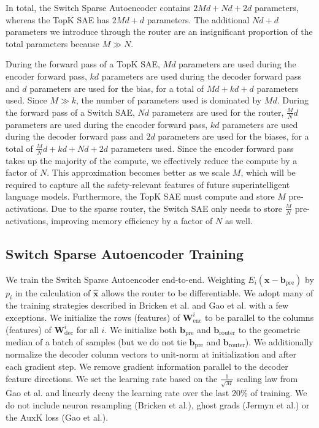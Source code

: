 \documentclass{article} %
\begin{document}
In total, the Switch Sparse Autoencoder contains \( 2Md + Nd + 2d \) parameters, whereas the TopK SAE has \( 2Md + d \) parameters. The additional \( Nd + d \) parameters we introduce through the router are an insignificant proportion of the total parameters because \( M \gg N \).

During the forward pass of a TopK SAE, \( Md \) parameters are used during the encoder forward pass, \( kd \) parameters are used during the decoder forward pass and \( d \) parameters are used for the bias, for a total of \( Md + kd + d \) parameters used. Since \( M \gg k \), the number of parameters used is dominated by \( Md \). During the forward pass of a Switch SAE, \( Nd \) parameters are used for the router, \( \frac{M}{N} d \) parameters are used during the encoder forward pass, \( kd \) parameters are used during the decoder forward pass and \( 2d \) parameters are used for the biases, for a total of \( \frac{M}{N} d + kd + Nd + 2d \) parameters used. Since the encoder forward pass takes up the majority of the compute, we effectively reduce the compute by a factor of \( N \). This approximation becomes better as we scale \( M \), which will be required to capture all the safety-relevant features of future superintelligent language models. Furthermore, the TopK SAE must compute and store \( M \) pre-activations. Due to the sparse router, the Switch SAE only needs to store \( \frac{M}{N} \) pre-activations, improving memory efficiency by a factor of \( N \) as well.

\subsection{Switch Sparse Autoencoder Training}
We train the Switch Sparse Autoencoder end-to-end. Weighting $E_i(\mathbf{x} - \mathbf{b}_{\text{pre}})$ by $p_i$ in the calculation of $\hat{\mathbf{x}}$ allows the router to be differentiable. We adopt many of the training strategies described in Bricken et al. and Gao et al. with a few exceptions. We initialize the rows (features) of $\mathbf{W}_{\text{enc}}^i$ to be parallel to the columns (features) of $\mathbf{W}_{\text{dec}}^i$ for all $i$. We initialize both $\mathbf{b}_{\text{pre}}$ and $\mathbf{b}_{\text{router}}$ to the geometric median of a batch of samples (but we do not tie $\mathbf{b}_{\text{pre}}$ and $\mathbf{b}_{\text{router}}$). We additionally normalize the decoder column vectors to unit-norm at initialization and after each gradient step. We remove gradient information parallel to the decoder feature directions. We set the learning rate based on the $\frac{1}{\sqrt{M}}$ scaling law from Gao et al. and linearly decay the learning rate over the last 20\% of training. We do not include neuron resampling (Bricken et al.), ghost grads (Jermyn et al.) or the AuxK loss (Gao et al.).
\end{document}

